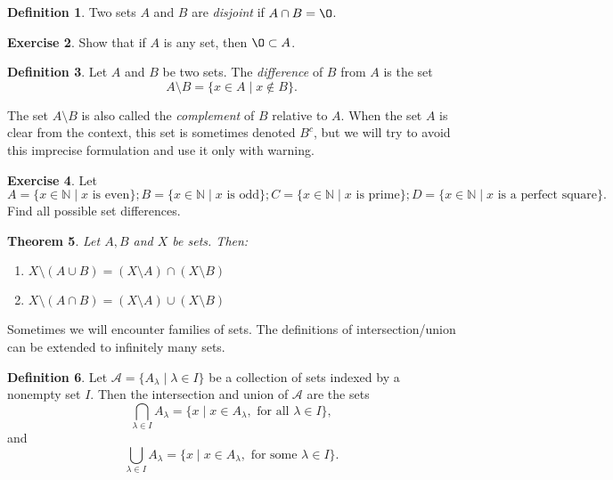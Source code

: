 \documentclass[11pt]{article}
\newcommand{\bbN}{\mathbb{N}}
\renewcommand{\emptyset}{\O}
\newtheorem{theorem}{Theorem}[section]
\theoremstyle{definition}
\newtheorem{definition}[theorem]{Definition}
\newtheorem{exercise}[theorem]{Exercise}
\numberwithin{equation}{subsection}
\begin{document}
\begin{definition}  
Two sets $A$ and $B$ are \emph{disjoint} if $A\cap B=\emptyset$.
\end{definition}  

\begin{exercise}  
Show that if $A$ is any set, then $\emptyset\subset A$.
\end{exercise}


\begin{definition}  
Let $A$ and $B$ be two sets. 
The \emph{difference} of $B$ from $A$ is the set
\[
A \setminus B = \{ x \in A \mid x \notin B \}.
\]
\end{definition}

The set $A \setminus B$ is also called the \emph{complement} of $B$ relative to $A$.
When the set $A$ is clear from the context, this set is sometimes denoted $B^{c}$, but we will 
try to avoid this imprecise formulation and use it only with warning.

\begin{exercise} 
Let $A=\{x\in\bbN\mid x\text{ is even}\}; B=\{x\in\bbN\mid x\text{ is odd}\}; C=\{x\in\bbN\mid x\text{ is prime}\}; D=\{x\in\bbN\mid x\text{ is a perfect square}\}.$
Find all possible set differences.
\end{exercise} 

\begin{theorem} 
Let $A,B$ and $X$ be sets.  Then:
\begin{enumerate}
\item[a)]
$X\setminus (A\cup B)=(X\setminus A)\cap (X\setminus B)$

\item[b)]
$X\setminus (A\cap B)=(X\setminus A)\cup (X\setminus B)$
\end{enumerate}
\end{theorem}

Sometimes we will encounter families of sets. The definitions of intersection/union can be extended to infinitely many sets. 


\begin{definition}

 Let $\mathcal{A}=\{A_\lambda\mid \lambda\in I\}$ be a collection of sets indexed by a nonempty set $I.$ Then the intersection and union of $\mathcal{A}$ are the sets
$$\bigcap_{\lambda\in I} A_\lambda =\{x\mid x\in A_\lambda, \text{ for all } \lambda\in I\},$$
and
$$\bigcup_{\lambda\in I}A_\lambda =\{x\mid x\in A_\lambda, \text{ for some }\lambda\in I\}.$$
\end{definition}
\end{document}
